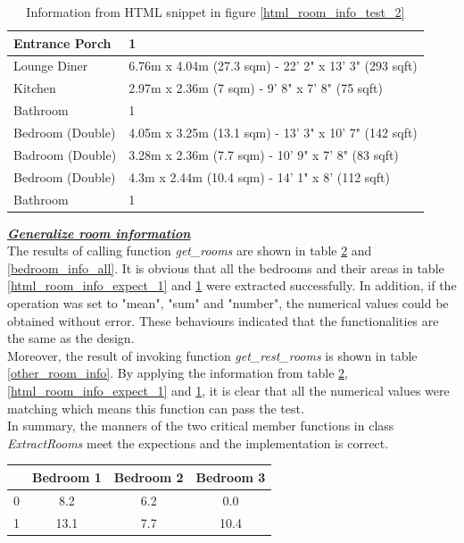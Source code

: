 \documentclass[12pt,twoside]{report}
\begin{document}
\begin{table}[h]
	\centering
	\caption{Information from HTML snippet in figure \ref*{html_room_info_test_2}}
	\begin{tabular} {| l | l |}
		\hline
		Entrance Porch & 1\\
		\hline
		Lounge Diner & 6.76m x 4.04m (27.3 sqm) - 22' 2" x 13' 3" (293 sqft)\\
		\hline
		Kitchen & 2.97m x 2.36m (7 sqm) - 9' 8" x 7' 8" (75 sqft)\\
		\hline
		Bathroom & 1\\
		\hline
		Bedroom (Double) & 4.05m x 3.25m (13.1 sqm) - 13' 3" x 10' 7" (142 sqft)\\
		\hline 
		Badroom (Double) & 3.28m x 2.36m (7.7 sqm) - 10' 9" x 7' 8" (83 sqft)\\
		\hline
		Bedroom (Double) & 4.3m x 2.44m (10.4 sqm) - 14' 1" x 8' (112 sqft)\\
		\hline
		Bathroom & 1\\
		\hline
	\end{tabular}
	\label{html_room_info_expect_2}
\end{table}

\textbf{\textit{\underline{Generalize room information}}} \\
The results of calling function \textit{get\_rooms} are shown in table \ref{bedroom_info_split} and \ref{bedroom_info_all}. It is obvious that all the bedrooms and their areas in table \ref{html_room_info_expect_1} and \ref{html_room_info_expect_2} were extracted successfully. In addition, if the operation was set to "mean", "sum" and "number", the numerical values could be obtained without error. These behaviours indicated that the functionalities are the same as the design. 
\\

Moreover, the result of invoking function \textit{get\_rest\_rooms} is shown in table \ref{other_room_info}. By applying the information from table \ref{bedroom_info_split}, \ref{html_room_info_expect_1} and \ref{html_room_info_expect_2}, it is clear that all the numerical values were matching which means this function can pass the test. 
\\ 

In summary, the manners of the two critical member functions in class \textit{ExtractRooms} meet the expections and the implementation is correct. 
\\

\begin{table}[h]
	\centering
	\label{bedroom_info_split}
	\begin{tabular}{| c | c | c | c |}
		\hline
		& Bedroom 1 & Bedroom 2 & Bedroom 3 \\
		\hline
		0 & 8.2 & 6.2 & 0.0 \\
		\hline
		1 & 13.1 & 7.7 & 10.4 \\
		\hline
	\end{tabular}
\end{table}
\end{document}
